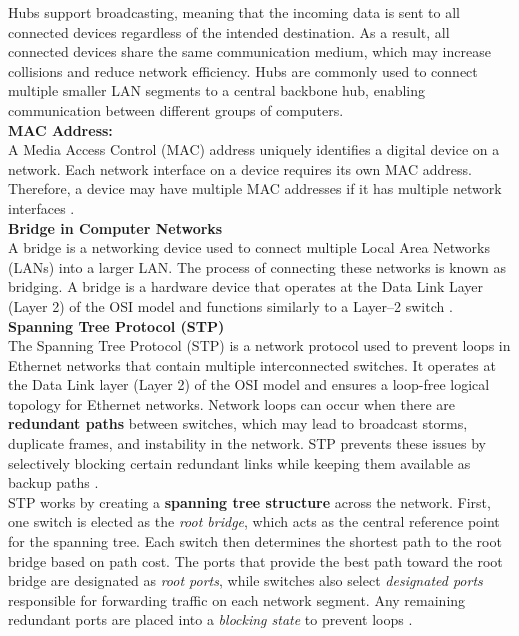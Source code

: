 \documentclass[a4paper,12pt]{article}
\begin{document}
\noindent
Hubs support broadcasting, meaning that the incoming data is sent to all connected devices regardless of the intended destination. As a result, all connected devices share the same communication medium, which may increase collisions and reduce network efficiency. Hubs are commonly used to connect multiple smaller LAN segments to a central backbone hub, enabling communication between different groups of computers.\\

\noindent
\textbf{MAC Address: }\\
\noindent
A Media Access Control (MAC) address uniquely identifies a digital device on a network. Each network interface on a device requires its own MAC address. Therefore, a device may have multiple MAC addresses if it has multiple network interfaces \cite{coursera_mac_address}. \\

\noindent
\textbf{Bridge in Computer Networks}\\
\noindent
A bridge is a networking device used to connect multiple Local Area Networks (LANs) into a larger LAN. The process of connecting these networks is known as bridging. A bridge is a hardware device that operates at the Data Link Layer (Layer 2) of the OSI model and functions similarly to a Layer--2 switch \cite{gfg_bridge_network}.\\


\noindent
\textbf{Spanning Tree Protocol (STP)}\\
\noindent
The Spanning Tree Protocol (STP) is a network protocol used to prevent loops in Ethernet networks that contain multiple interconnected switches. It operates at the Data Link layer (Layer 2) of the OSI model and ensures a loop-free logical topology for Ethernet networks. Network loops can occur when there are \textbf{redundant paths} between switches, which may lead to broadcast storms, duplicate frames, and instability in the network. STP prevents these issues by selectively blocking certain redundant links while keeping them available as backup paths \cite{wiki_stp}.\\

\noindent
STP works by creating a \textbf{spanning tree structure} across the network. First, one switch is elected as the \textit{root bridge}, which acts as the central reference point for the spanning tree. Each switch then determines the shortest path to the root bridge based on path cost. The ports that provide the best path toward the root bridge are designated as \textit{root ports}, while switches also select \textit{designated ports} responsible for forwarding traffic on each network segment. Any remaining redundant ports are placed into a \textit{blocking state} to prevent loops \cite{wiki_stp}.\\
\end{document}
